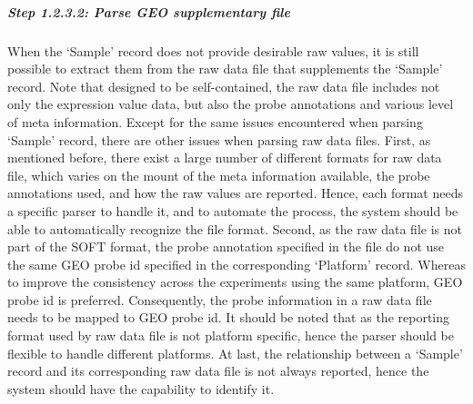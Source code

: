 \subparagraph{\textit{Step 1.2.3.2: Parse GEO supplementary file}}

When the `Sample' record does not provide desirable raw values, it is still
possible to extract them from the raw data file that supplements the `Sample'
record.
%
Note that designed to be self-contained, the raw data file includes not only
the expression value data, but also the probe annotations and various level
of meta information.
%
Except for the same issues encountered when parsing `Sample' record, there
are other issues when parsing raw data files.
First, as mentioned before, there exist a large number of different formats
for raw data file, which varies on the mount of the meta information
available, the probe annotations used, and how the raw values are reported.
%
Hence, each format needs a specific parser to handle it, and to automate the
process, the system should be able to automatically recognize the file format.
Second, as the raw data file is not part of the SOFT format, the probe
annotation specified in the file do not use the same GEO probe id specified in
the corresponding `Platform' record.
%
Whereas to improve the consistency across the experiments using the same
platform, GEO probe id is preferred.
%
Consequently, the probe information in a raw data file needs to be mapped to
GEO probe id.
It should be noted that as the reporting format used by raw data file is not
platform specific, hence the parser should be flexible to handle different
platforms.
%
At last, the relationship between a `Sample' record and its corresponding
raw data file is not always reported, hence the system should have the
capability to identify it.


